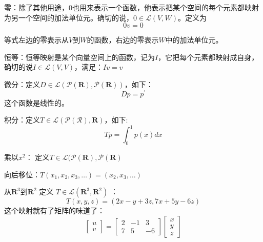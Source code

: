 \documentclass[10pt,a4paper,UTF8]{article}
\begin{document}
\begin{instance}
零：除了其他用途，\(0\)也用来表示一个函数，他表示把某个空间的每个元素都映射为另一个空间的加法单位元。确切的说，\(0\in \mathcal{L}(V,W)\)。定义为\[0v = 0\]

等式左边的零表示从\(V\)到\(W\)的函数，右边的零表示\(W\)中的加法单位元。

恒等：恒等映射是某个向量空间上的函数，记为\(I\)，它把每个元素都映射成自身，确切的说\(I\in \mathcal{L}(V,V)\)，满足：\(Iv = v\)

微分：定义\(D\in \mathcal{L}(\mathcal{P}(\mathbf{R}),\mathcal{P}(\mathbf{R}))\)，如下：\[Dp = p^{'}\]这个函数是线性的。

积分：定义\(T\in \mathcal{L}(\mathcal{P}(\mathcal{R}),\mathbf{R})\)，如下:\[Tp = \int_{0}^{1} p(x)dx\]

乘以\(x^{2}\)： 定义\(T\in \mathcal{L}(\mathcal{P}(\mathbf{R}),\mathcal{P}(\mathbf{R})\)

向后移位：\(T(x_{1},x_{2},x_{3},\ldots ) = (x_{2},x_{3},\ldots )\)

从\(\mathbf{R}^{3}\)到\(\mathbf{R}^{2}\) 定义 \(T\in \mathcal{L}(\mathbf{R}^{3}, \mathbf{R}^{2})\) ：\[T(x,y,z) = (2x-y +3z,7x+5y-6z)\]
这个映射就有了矩阵的味道了：
\begin{equation}
\label{eq:1}
\begin{bmatrix}
u \\ v
\end{bmatrix}
=
\begin{bmatrix}
2 & -1 & 3 \\
7 & 5  & -6
\end{bmatrix}
\begin{bmatrix}
x \\ y \\ z
\end{bmatrix}
\end{equation}
\end{instance}
\end{document}
